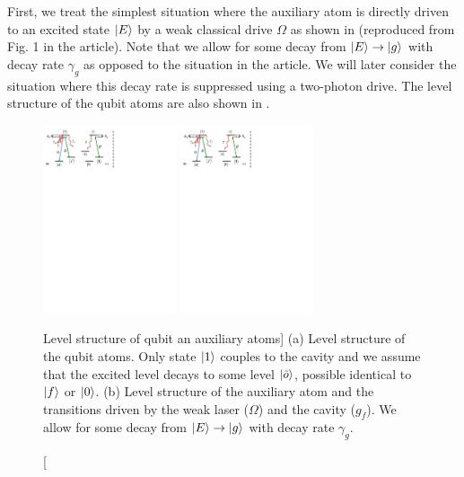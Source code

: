 First, we treat the simplest situation where the auxiliary atom is directly
driven to an excited state $| E \rangle$ by a weak classical drive $\Omega$ as shown
in  (reproduced from Fig. 1 in the article). Note that we
allow for some decay from $| E \rangle\to| g \rangle$ with decay rate $\gamma_{g}$ as
opposed to the situation in the article. We will later consider the situation
where this decay rate is suppressed using a two-photon drive. The level
structure of the qubit atoms are also shown in .

\begin{figure} [H]
\centering
\includegraphics[width=0.35\textwidth]{./figs_Borregaard_PRL2015/figureS1a}
\includegraphics[width=0.35\textwidth]{./figs_Borregaard_PRL2015/figureS1b}
\caption
[Level structure of qubit an auxiliary atoms]
{(a) Level structure of the qubit atoms. Only state $| 1 \rangle$ couples
to the cavity and we assume that the excited level decays to some level
$| \tilde{o} \rangle$, possible identical to $| f \rangle$ or $| 0 \rangle$. (b) Level
structure of the auxiliary atom and the transitions driven by the weak laser
($\Omega$) and the cavity ($g_{f}$). We allow for some decay from
$| E \rangle\to| g \rangle$ with decay rate $\gamma_{g}$. }
\label{fig:figureS1}
\end{figure}

